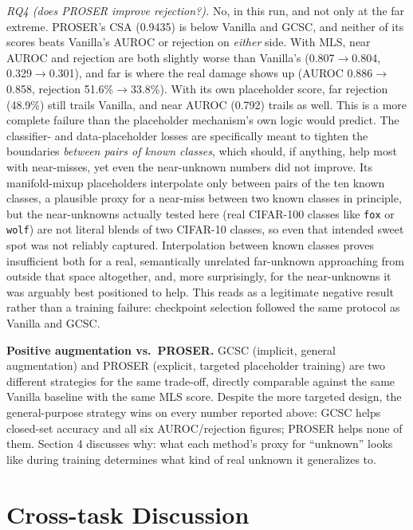 \documentclass{article}
\begin{document}
\emph{RQ4 (does PROSER improve rejection?).} No, in this run, and not only at the far extreme.
PROSER's CSA (0.9435) is below Vanilla and GCSC, and neither of its scores beats Vanilla's AUROC or
rejection on \emph{either} side. With MLS, near AUROC and rejection are both slightly worse than
Vanilla's (0.807$\to$0.804, 0.329$\to$0.301), and far is where the real damage shows up (AUROC
0.886$\to$0.858, rejection 51.6\%$\to$33.8\%). With its own placeholder score, far rejection
(48.9\%) still trails Vanilla, and near AUROC (0.792) trails as well. This is a more complete
failure than the placeholder mechanism's own logic would predict. The classifier- and
data-placeholder losses are specifically meant to tighten the boundaries \emph{between pairs of
known classes}, which should, if anything, help most with near-misses, yet even the near-unknown
numbers did not improve. Its manifold-mixup placeholders interpolate only between pairs of the ten
known classes, a plausible proxy for a near-miss between two known classes in principle, but the
near-unknowns actually tested here (real CIFAR-100 classes like \texttt{fox} or \texttt{wolf}) are
not literal blends of two CIFAR-10 classes, so even that intended sweet spot was not reliably
captured. Interpolation between known classes proves insufficient both for a real,
semantically unrelated far-unknown approaching from outside that space altogether, and, more
surprisingly, for the near-unknowns it was arguably best positioned to help. This reads as a
legitimate negative result rather than a training failure: checkpoint selection followed the same
protocol as Vanilla and GCSC.

\textbf{Positive augmentation vs.\ PROSER.} GCSC (implicit, general augmentation) and PROSER (explicit,
targeted placeholder training) are two different strategies for the same trade-off, directly comparable
against the same Vanilla baseline with the same MLS score. Despite the more targeted design, the
general-purpose strategy wins on every number reported above: GCSC helps closed-set accuracy and all six
AUROC/rejection figures; PROSER helps none of them. Section 4 discusses why: what each method's proxy
for ``unknown'' looks like during training determines what kind of real unknown it generalizes to.

\FloatBarrier
\section{Cross-task Discussion}
\end{document}
